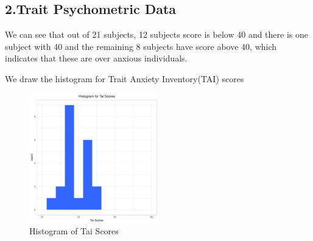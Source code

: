 \documentclass[12pt,epsf]{report}
\begin{document}
{\subsection*{2.Trait Psychometric Data}
We can see that out of 21 subjects, 12 subjects score is below 40 and there is one subject with 40 and the remaining 8 subjects have score above 40, which indicates that these are over anxious individuals.
We draw the histogram for Trait Anxiety Inventory(TAI) scores\\
\begin{figure}[!htb]
	\centering
	\includegraphics[width=0.5\textwidth]{tai_plot.pdf}
	\caption{Histogram of Tai Scores}
	\centering
\end{figure}
\FloatBarrier
}
\end{document}

